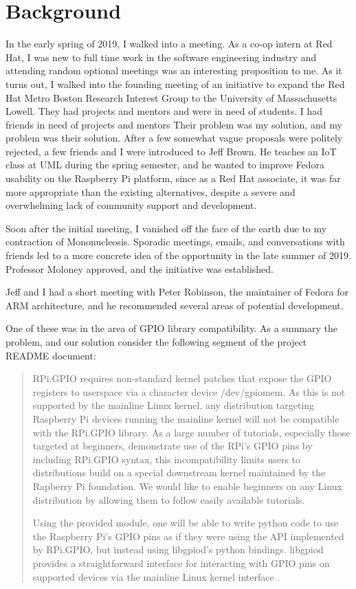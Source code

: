 \documentclass{article}
\begin{document}
\section{Background}

In the early spring of 2019,
I walked into a meeting.
As a co-op intern at Red Hat,
I was new to full time work
in the software engineering industry
and attending random optional meetings
was an interesting proposition to me.
As it turns out,
I walked into the founding meeting
of an initiative to expand
the Red Hat Metro Boston Research Interest Group
to the University of Massachusetts Lowell.
They had projects and mentors
and were in need of students.
I had friends in need
of projects and mentors
Their problem was my solution,
and my problem was their solution.
After a few somewhat vague proposals
were politely rejected,
a few friends and I were introduced to Jeff Brown.
He teaches an IoT class at UML during the spring semester,
and he wanted to improve Fedora usability
on the Raspberry Pi platform,
since as a Red Hat associate,
it was far more appropriate
than the existing alternatives,
despite a severe and overwhelming
lack of community support and development.

Soon after the initial meeting,
I vanished off the face of the earth
due to my contraction of Mononucleosis.
Sporadic meetings, emails, and conversations with friends
led to a more concrete idea of the opportunity
in the late summer of 2019.
Professor Moloney approved,
and the initiative was established.

Jeff and I had a short meeting
with Peter Robinson,
the maintainer of
Fedora for ARM architecture,
and he recommended several areas
of potential development.

One of these was in the area
of GPIO library compatibility.
As a summary the problem,
and our solution
consider the following segment
of the project README document:

\begin{quote}
RPi.GPIO requires non-standard kernel patches that expose the GPIO registers to userspace via a character device /dev/gpiomem. As this is not supported by the mainline Linux kernel, any distribution targeting Raspberry Pi devices running the mainline kernel will not be compatible with the RPi.GPIO library. As a large number of tutorials, especially those targeted at beginners, demonstrate use of the RPi's GPIO pins by including RPi.GPIO syntax, this incompatibility limits users to distributions build on a special downstream kernel maintained by the Rapberry Pi foundation. We would like to enable beginners on any Linux distribution by allowing them to follow easily available tutorials.

Using the provided module, one will be able to write python code to use the Raspberry Pi's GPIO pins as if they were using the API implemented by RPi.GPIO, but instead using libgpiod's python bindings. libgpiod provides a straightforward interface for interacting with GPIO pins on supported devices via the mainline Linux kernel interface \cite{underground}.
\end{quote}
\end{document}

